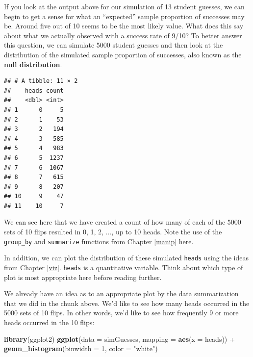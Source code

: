 \documentclass[]{tufte-book}
\newenvironment{Shaded}{\begin{snugshade}}{\end{snugshade}}
\newcommand{\KeywordTok}[1]{\textcolor[rgb]{0.13,0.29,0.53}{\textbf{{#1}}}}
\newcommand{\DataTypeTok}[1]{\textcolor[rgb]{0.13,0.29,0.53}{{#1}}}
\newcommand{\DecValTok}[1]{\textcolor[rgb]{0.00,0.00,0.81}{{#1}}}
\newcommand{\StringTok}[1]{\textcolor[rgb]{0.31,0.60,0.02}{{#1}}}
\newcommand{\NormalTok}[1]{{#1}}
\theoremstyle{definition}
\theoremstyle{definition}
\theoremstyle{remark}
\begin{document}
If you look at the output above for our simulation of 13 student
guesses, we can begin to get a sense for what an ``expected'' sample
proportion of successes may be. Around five out of 10 seems to be the
most likely value. What does this say about what we actually observed
with a success rate of 9/10? To better answer this question, we can
simulate 5000 student guesses and then look at the distribution of the
simulated sample proportion of successes, also known as the \textbf{null
distribution}.

\begin{Shaded}
\end{Shaded}

\begin{verbatim}
## # A tibble: 11 × 2
##    heads count
##    <dbl> <int>
## 1      0     5
## 2      1    53
## 3      2   194
## 4      3   585
## 5      4   983
## 6      5  1237
## 7      6  1067
## 8      7   615
## 9      8   207
## 10     9    47
## 11    10     7
\end{verbatim}

We can see here that we have created a count of how many of each of the
5000 sets of 10 flips resulted in 0, 1, 2, \(\ldots\), up to 10 heads.
Note the use of the \texttt{group\_by} and \texttt{summarize} functions
from Chapter \ref{manip} here.

In addition, we can plot the distribution of these simulated
\texttt{heads} using the ideas from Chapter \ref{viz}. \texttt{heads} is
a quantitative variable. Think about which type of plot is most
appropriate here before reading further.

We already have an idea as to an appropriate plot by the data
summarization that we did in the chunk above. We'd like to see how many
heads occurred in the 5000 sets of 10 flips. In other words, we'd like
to see how frequently 9 or more heads occurred in the 10 flips:

\begin{Shaded}
\begin{Highlighting}[]
\KeywordTok{library}\NormalTok{(ggplot2)}
\KeywordTok{ggplot}\NormalTok{(}\DataTypeTok{data =} \NormalTok{simGuesses, }\DataTypeTok{mapping =} \KeywordTok{aes}\NormalTok{(}\DataTypeTok{x =} \NormalTok{heads)) +}
\StringTok{  }\KeywordTok{geom_histogram}\NormalTok{(}\DataTypeTok{binwidth =} \DecValTok{1}\NormalTok{, }\DataTypeTok{color =} \StringTok{"white"}\NormalTok{)}
\end{Highlighting}
\end{Shaded}
\end{document}
